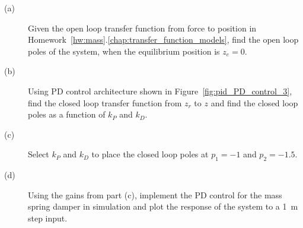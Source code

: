 
\begin{description}
\item[(a)]
Given the open loop transfer function from force to position in 
Homework~\ref{hw:mass}.\ref{chap:transfer_function_models}, find the open loop poles of the system, when the equilibrium position is $z_e=0$.
\item[(b)]
Using PD control architecture shown in Figure~\ref{fig:pid_PD_control_3}, find the closed loop transfer function from $z_r$ to $z$ and find the closed loop poles as a function of $k_P$ and $k_D$.
\item[(c)]  Select $k_P$ and $k_D$ to place the closed loop poles at $p_1=-1$ and $p_2=-1.5$.
\item[(d)] Using the gains from part (c), implement the PD control for the mass spring damper in simulation and plot the response of the system to a 1~m step input.
\end{description}
